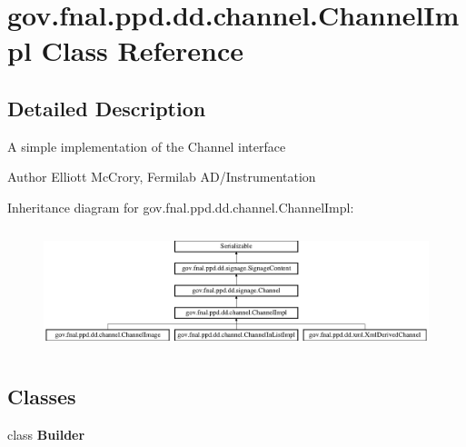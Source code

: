\hypertarget{classgov_1_1fnal_1_1ppd_1_1dd_1_1channel_1_1ChannelImpl}{\section{gov.\-fnal.\-ppd.\-dd.\-channel.\-Channel\-Impl Class Reference}
\label{classgov_1_1fnal_1_1ppd_1_1dd_1_1channel_1_1ChannelImpl}
}


\subsection{Detailed Description}
A simple implementation of the Channel interface

\begin{DoxyAuthor}{Author}
Elliott Mc\-Crory, Fermilab A\-D/\-Instrumentation 
\end{DoxyAuthor}
Inheritance diagram for gov.\-fnal.\-ppd.\-dd.\-channel.\-Channel\-Impl\-:\begin{figure}[H]
\begin{center}
\leavevmode
\includegraphics[height=3.589744cm]{classgov_1_1fnal_1_1ppd_1_1dd_1_1channel_1_1ChannelImpl}
\end{center}
\end{figure}
\subsection*{Classes}
\begin{DoxyCompactItemize}
\item 
class {\bfseries Builder}
\end{DoxyCompactItemize}
